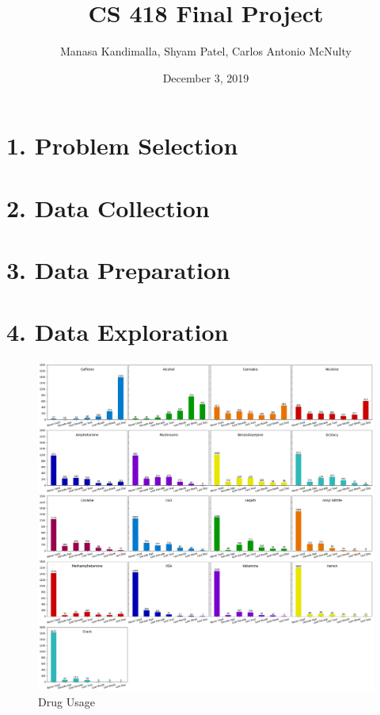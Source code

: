 \documentclass[10pt]{article}
\title{CS 418 Final Project}
\date{December 3, 2019}
\author {Manasa Kandimalla, Shyam Patel, Carlos Antonio McNulty}
\begin{document}
\maketitle

\section*{1. Problem Selection}

\section*{2. Data Collection}

\section*{3. Data Preparation}

\section*{4. Data Exploration}

\begin{figure}[H]
\caption{Drug Usage}
\centering
\includegraphics[scale=0.25]{drugs.png}
\end{figure}
\end{document}
